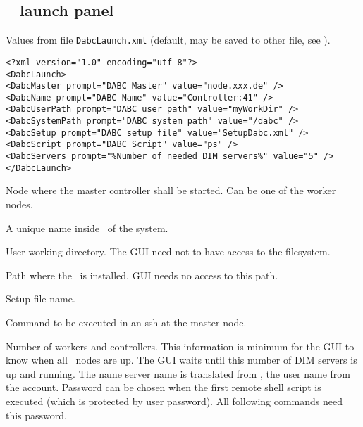 \subsection{\dabc~ launch panel}
Values from file {\tt DabcLaunch.xml} (default, may be saved to other file,
see ).
{\small \begin{verbatim}
<?xml version="1.0" encoding="utf-8"?>
<DabcLaunch>
<DabcMaster prompt="DABC Master" value="node.xxx.de" />
<DabcName prompt="DABC Name" value="Controller:41" />
<DabcUserPath prompt="DABC user path" value="myWorkDir" />
<DabcSystemPath prompt="DABC system path" value="/dabc" />
<DabcSetup prompt="DABC setup file" value="SetupDabc.xml" />
<DabcScript prompt="DABC Script" value="ps" />
<DabcServers prompt="%Number of needed DIM servers%" value="5" />
</DabcLaunch>
\end{verbatim}
\bdes
\item[DabcMaster:] Node where the master controller shall be started.
Can be one of the worker nodes.
\item[DabcName:] A unique name inside \dabc\ of the system.
\item[DabcUserPath:] User working directory. The GUI need not to have
access to the filesystem. 
\item[DabcSystemPath:] Path where the \dabc\ is installed. GUI needs no access to this path.
\item[DabcSetup:] Setup file name.
\item[DabcScript:] Command to be executed in an ssh at the master node.
\item[DabcServers:] Number of workers and controllers. This information
is minimum for the GUI to know when all \dabc\ nodes are up. The GUI waits until
this number of DIM servers is up and running.
\edes
The name server name is translated from ,
the user name from the account. Password can be chosen when
the first remote shell script is executed (which is protected by
user password). All following commands need this password.
}
